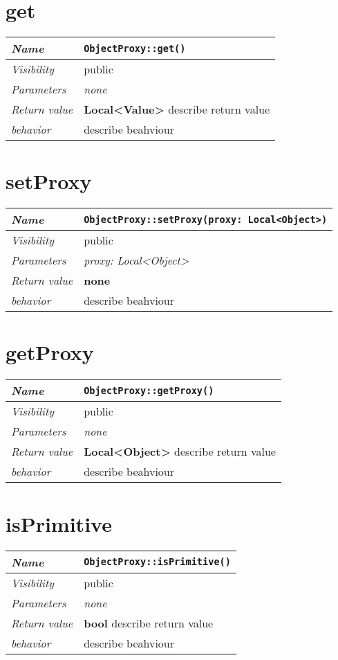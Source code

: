  \section{get}
\begin{longtable}{p{3cm} @{\hskip 1cm} p{12cm}}
 \hline
\textit{Name} & \texttt{ObjectProxy::get()}\\
\hline
 \textit{Visibility} & public\\
\hline
\textit{Parameters} & \textit{none}\\
\hline
\textit{Return value} & \textbf{ Local<Value>} describe return value\\
  \hline
 \textit{behavior} & describe beahviour \\
\hline
\end{longtable} \pagebreak
 \section{setProxy}
\begin{longtable}{p{3cm} @{\hskip 1cm} p{12cm}}
 \hline
\textit{Name} & \texttt{ObjectProxy::setProxy(proxy: Local<Object>)}\\
\hline
 \textit{Visibility} & public\\
\hline
\textit{Parameters} & \textit{proxy: Local<Object>}\\
\hline
\textit{Return value} & \textbf{none}\\
  \hline
 \textit{behavior} & describe beahviour \\
\hline
\end{longtable} \pagebreak
 \section{getProxy}
\begin{longtable}{p{3cm} @{\hskip 1cm} p{12cm}}
 \hline
\textit{Name} & \texttt{ObjectProxy::getProxy()}\\
\hline
 \textit{Visibility} & public\\
\hline
\textit{Parameters} & \textit{none}\\
\hline
\textit{Return value} & \textbf{ Local<Object>} describe return value\\
  \hline
 \textit{behavior} & describe beahviour \\
\hline
\end{longtable} \pagebreak
 \section{isPrimitive}
\begin{longtable}{p{3cm} @{\hskip 1cm} p{12cm}}
 \hline
\textit{Name} & \texttt{ObjectProxy::isPrimitive()}\\
\hline
 \textit{Visibility} & public\\
\hline
\textit{Parameters} & \textit{none}\\
\hline
\textit{Return value} & \textbf{ bool} describe return value\\
  \hline
 \textit{behavior} & describe beahviour \\
\hline
\end{longtable} \pagebreak
 
